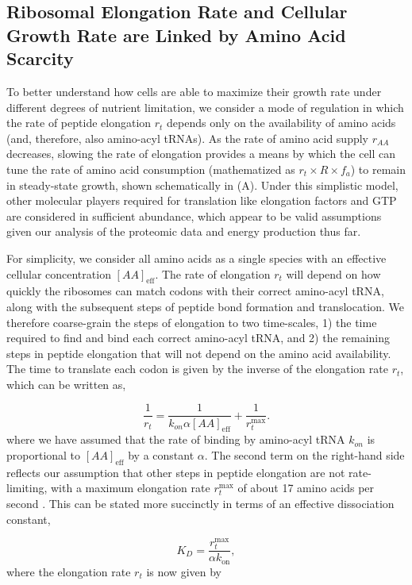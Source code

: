 \subsection{Ribosomal Elongation Rate and Cellular Growth Rate are Linked by Amino Acid Scarcity}
To better understand how cells are able to maximize their growth rate under
different degrees of nutrient limitation, we consider a mode of regulation in
which the rate of peptide elongation $r_t$ depends only on the availability
of amino acids (and, therefore, also amino-acyl tRNAs). As the rate of amino
acid supply $r_{AA}$ decreases, slowing the rate of elongation provides a
means by which the cell can tune the rate of amino acid consumption
(mathematized as $r_t \times R \times f_a$) to remain in steady-state growth,
shown schematically in (A). Under this simplistic
model, other molecular players required for translation like elongation
factors and GTP are considered in sufficient abundance, which appear to be
valid assumptions given our analysis of the proteomic data and energy
production thus far.

For simplicity, we consider all amino acids as a single
species with an effective cellular concentration $[AA]_\text{eff}$. The
rate of elongation $r_t$ will depend on how quickly the ribosomes can match
codons with their correct amino-acyl tRNA, along with the subsequent steps of
peptide bond formation and translocation. We therefore coarse-grain the steps of
elongation to two time-scales,  1) the time required
to find and bind each correct amino-acyl tRNA, and 2) the remaining steps in
peptide elongation that will not depend on the amino acid availability. The
time to translate each codon is given by the inverse of the elongation rate
$r_t$, which can be written as,

\begin{equation}
\frac{1}{r_t} = \frac{1}{k_{on} \alpha [AA]_{\text{eff}}} + \frac{1}{r_{t}^{\text{max}}}.
\end{equation}
where we have assumed that the rate of binding by amino-acyl tRNA $k_{on}$ is
proportional to $[AA]_{\text{eff}}$ by a constant $\alpha$. The second term on the
right-hand side reflects our assumption that other steps in peptide elongation
are not rate-limiting, with a maximum elongation rate $r_{t}^{\text{max}}$ of
about 17 amino acids per second \cite{dai2016}. This can be stated more succinctly in
terms of an effective dissociation constant,

\begin{equation}
    K_D = \frac{r_{t}^{\text{max}}}{\alpha k_\text{on}},
\end{equation}
where the elongation rate $r_t$ is now given by

